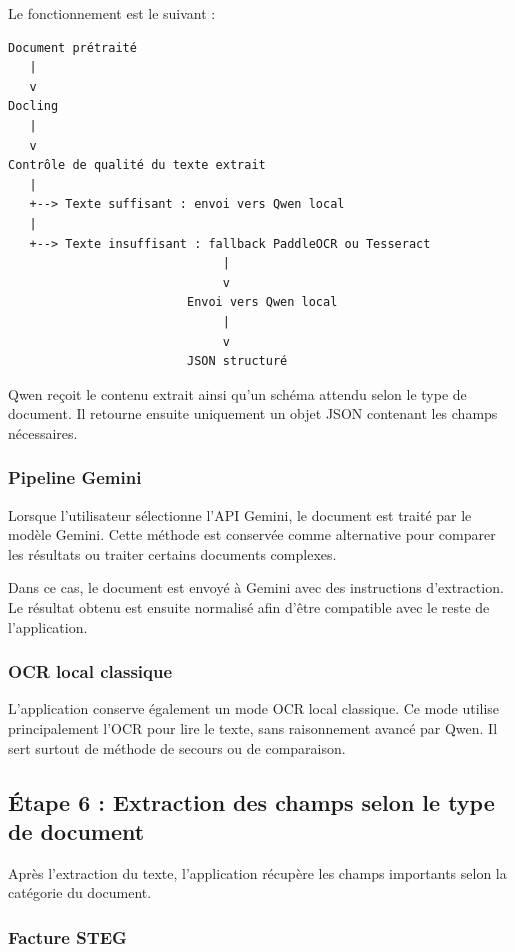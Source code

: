 Le fonctionnement est le suivant :

\begin{verbatim}
Document prétraité
   |
   v
Docling
   |
   v
Contrôle de qualité du texte extrait
   |
   +--> Texte suffisant : envoi vers Qwen local
   |
   +--> Texte insuffisant : fallback PaddleOCR ou Tesseract
                              |
                              v
                         Envoi vers Qwen local
                              |
                              v
                         JSON structuré
\end{verbatim}

Qwen reçoit le contenu extrait ainsi qu'un schéma attendu selon le type de document. Il retourne ensuite uniquement un objet JSON contenant les champs nécessaires.

\subsubsection{Pipeline Gemini}

Lorsque l'utilisateur sélectionne l'API Gemini, le document est traité par le modèle Gemini. Cette méthode est conservée comme alternative pour comparer les résultats ou traiter certains documents complexes.

Dans ce cas, le document est envoyé à Gemini avec des instructions d'extraction. Le résultat obtenu est ensuite normalisé afin d'être compatible avec le reste de l'application.

\subsubsection{OCR local classique}

L'application conserve également un mode OCR local classique. Ce mode utilise principalement l'OCR pour lire le texte, sans raisonnement avancé par Qwen. Il sert surtout de méthode de secours ou de comparaison.

\subsection{Étape 6 : Extraction des champs selon le type de document}

Après l'extraction du texte, l'application récupère les champs importants selon la catégorie du document.

\subsubsection{Facture STEG}


